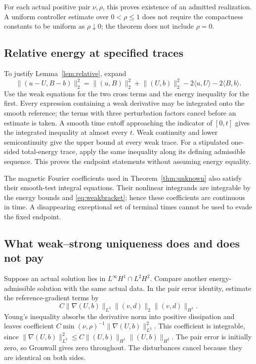 \documentclass[11pt,a4paper]{amsart}
\theoremstyle{definition}
\theoremstyle{remark}
\numberwithin{equation}{section}
\newcommand{\ip}[2]{\langle #1,#2\rangle}
\newcommand{\norm}[1]{\lVert #1\rVert}
\begin{document}
For each actual positive pair $\nu,\rho$, this proves existence of an admitted realization. A uniform controller estimate over $0<\rho\le1$ does not require the compactness constants to be uniform as $\rho\downarrow0$; the theorem does not include $\rho=0$.

\subsection{Relative energy at specified traces}
To justify Lemma~\ref{lem:relative}, expand
\[
 \norm{(u-U,B-b)}_2^2
 =\norm{(u,B)}_2^2+\norm{(U,b)}_2^2
       -2\ip uU-2\ip Bb.
\]
Use the weak equations for the two cross terms and the energy inequality for the first. Every expression containing a weak derivative may be integrated onto the smooth reference; the terms with three perturbation factors cancel before an estimate is taken. A smooth time cutoff approaching the indicator of $[0,t]$ gives the integrated inequality at almost every $t$. Weak continuity and lower semicontinuity give the upper bound at every weak trace. For a stipulated one-sided total-energy trace, apply the same inequality along its defining admissible sequence. This proves the endpoint statements without assuming energy equality.

The magnetic Fourier coefficients used in Theorem~\ref{thm:unknown} also satisfy their smooth-test integral equations. Their nonlinear integrands are integrable by the energy bounds and \eqref{eq:weakbracket}; hence these coefficients are continuous in time. A disappearing exceptional set of terminal times cannot be used to evade the fixed endpoint.

\subsection{What weak--strong uniqueness does and does not pay}
Suppose an actual solution lies in $L^\infty H^1\cap L^2H^2$. Compare another energy-admissible solution with the same actual data. In the pair error identity, estimate the reference-gradient terms by
\[
 C\norm{\nabla(U,b)}_{L^3}\norm{(v,d)}_2
                          \norm{(v,d)}_{H^1}.
\]
Young's inequality absorbs the derivative norm into positive dissipation and leaves coefficient
$C\min(\nu,\rho)^{-1}\norm{\nabla(U,b)}_{L^3}^2$.
This coefficient is integrable, since
$\norm{\nabla(U,b)}_{L^3}^2\le
C\norm{(U,b)}_{H^1}\norm{(U,b)}_{H^2}$.
The pair error is initially zero, so Gronwall gives zero throughout. The disturbances cancel because they are identical on both sides.
\end{document}

